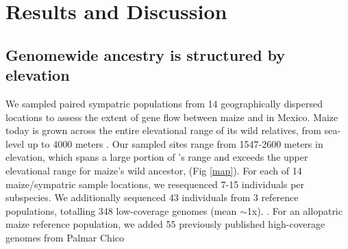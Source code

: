 \section*{Results and Discussion}

\subsection*{Genomewide \mexicana ancestry is structured by elevation}

We sampled paired sympatric populations from 14 geographically dispersed locations to assess the extent of gene flow between maize and \mexicana in Mexico.
Maize today is grown across the entire elevational range of its wild relatives, from sea-level up to 4000 meters \cite{Staller:2016}.
Our sampled sites range from 1547-2600 meters in elevation, which spans a large portion of \mexicana's range and exceeds the upper elevational range for maize's wild ancestor, \parviglumis (Fig \ref{map}).
For each of 14 maize/\mexicana sympatric sample locations, we resequenced 7-15 individuals per subspecies. We additionally sequenced 43 individuals from 3 \mexicana reference populations, totalling 348 low-coverage genomes (mean $\sim$1x). .
For an allopatric maize reference population, we added 55 previously published high-coverage genomes from Palmar Chico \cite{Chen:2020_maize55}

